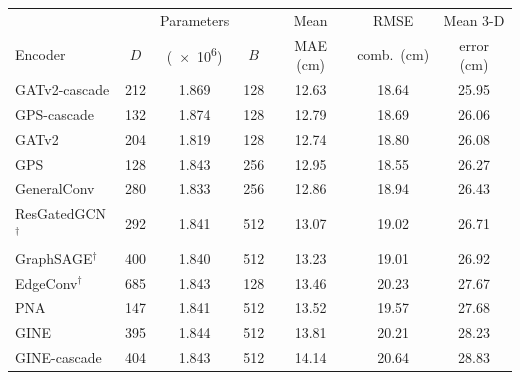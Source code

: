 \begin{tabular}{@{}l S[table-format=3.0] S[table-format=1.3] S[table-format=3.0] S[table-format=2.2] S[table-format=2.2] S[table-format=2.2]@{}}
\toprule
 & {} & {Parameters} & {} & {Mean} & {RMSE} & {Mean 3-D} \\
Encoder & {$D$} & {(\num{e6})} & {$B$} & {MAE (cm)} & {comb.\ (cm)} & {error (cm)} \\
\midrule
GATv2-cascade & 212 & 1.869 & 128 & 12.63 & 18.64 & 25.95 \\
GPS-cascade & 132 & 1.874 & 128 & 12.79 & 18.69 & 26.06 \\
GATv2 & 204 & 1.819 & 128 & 12.74 & 18.80 & 26.08 \\
GPS & 128 & 1.843 & 256 & 12.95 & 18.55 & 26.27 \\
GeneralConv & 280 & 1.833 & 256 & 12.86 & 18.94 & 26.43 \\
ResGatedGCN$^{\dagger}$ & 292 & 1.841 & 512 & 13.07 & 19.02 & 26.71 \\
GraphSAGE$^{\dagger}$ & 400 & 1.840 & 512 & 13.23 & 19.01 & 26.92 \\
EdgeConv$^{\dagger}$ & 685 & 1.843 & 128 & 13.46 & 20.23 & 27.67 \\
PNA & 147 & 1.841 & 512 & 13.52 & 19.57 & 27.68 \\
GINE & 395 & 1.844 & 512 & 13.81 & 20.21 & 28.23 \\
GINE-cascade & 404 & 1.843 & 512 & 14.14 & 20.64 & 28.83 \\
\bottomrule
\end{tabular}
